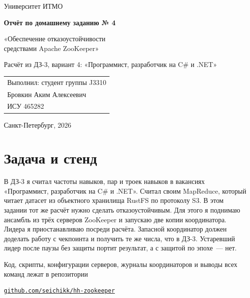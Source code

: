\documentclass[11pt,a4paper]{article}
\newcommand{\studentName}{Бровкин Аким Алексеевич}
\newcommand{\studentGroup}{J3310}
\newcommand{\studentIsu}{465282}
\newcommand{\repoUrl}{\texttt{github.com/seichikk/hh-zookeeper}}
\begin{document}
\begin{titlepage}
\centering
{\large Университет ИТМО\par}
\vspace{4.5cm}
{\LARGE\bfseries Отчёт по домашнему заданию № 4\par}
\vspace{0.6cm}
{\Large «Обеспечение отказоустойчивости\\средствами Apache ZooKeeper»\par}
\vspace{0.6cm}
{\normalsize Расчёт из ДЗ-3, вариант 4: «Программист, разработчик на C\# и .NET»\par}
\vfill
\begin{flushright}
\begin{tabular}{@{}l@{}}
Выполнил: студент группы \studentGroup\\
\studentName\\
ИСУ \studentIsu\\[1.2em]
\end{tabular}
\end{flushright}
\vspace{2cm}
{Санкт-Петербург, 2026\par}
\end{titlepage}

\newpage

\section{Задача и стенд}

В ДЗ-3 я считал частоты навыков, пар и троек навыков в вакансиях «Программист, разработчик на C\# и .NET». Считал своим MapReduce, который читает датасет из объектного хранилища RustFS по протоколу S3. В этом задании тот же расчёт нужно сделать отказоустойчивым. Для этого я поднимаю ансамбль из трёх серверов ZooKeeper и запускаю две копии координатора. Лидера я приостанавливаю посреди расчёта. Запасной координатор должен доделать работу с чекпоинта и получить те же числа, что в ДЗ-3. Устаревший лидер после паузы без защиты портит результат, а с защитой по эпохе~--- нет.

Код, скрипты, конфигурации серверов, журналы координаторов и выводы всех команд лежат в репозитории
\begin{center}\href{https://github.com/seichikk/hh-zookeeper}{\repoUrl}\end{center}
\end{document}
